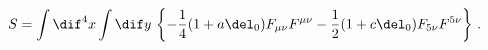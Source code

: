 \begin{equation}
S = \int \dif^4 x \int \dif y \, \left\{-\frac{1}{4}
(1+a\del_0)  F_{\mu\nu}F^{\mu\nu} -\frac{1}{2} (1+c\del_0)
F_{5\nu}F^{5\nu} \right\} \, . \label{gaugeLag}
\end{equation}

